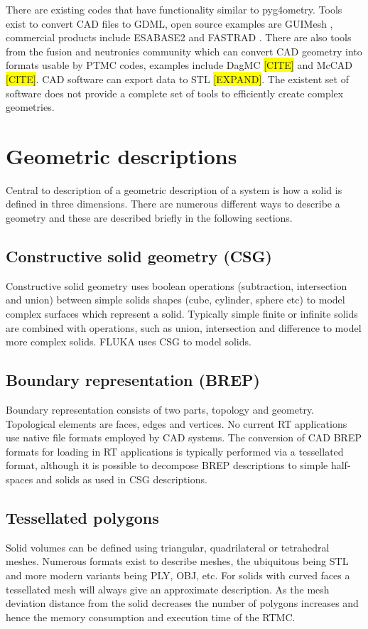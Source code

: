 \documentclass[final,5p,times,twocolumn]{elsarticle}
\begin{document}
There are existing codes that have functionality similar to pyg4ometry. Tools exist to convert CAD files to GDML, open source examples are GUIMesh \cite{GUIMesh_Pinto}, 
commercial products include ESABASE2 \cite{ESABASE2} and FASTRAD \cite{FASTRAD}. There are also tools from the fusion and neutronics community which 
can convert CAD geometry into formats usable by PTMC codes, examples include DagMC \colorbox{yellow}{[CITE]} and McCAD \colorbox{yellow}{[CITE]}.  
CAD software can export data to STL \colorbox{yellow}{[EXPAND]}. The existent set of software does not provide a complete set of tools to efficiently create complex geometries.   

\section{Geometric descriptions} \label{sec:geometric}
Central to description of a geometric description of a system is how a solid is defined in three dimensions. There are numerous different ways to describe a
geometry and these are described briefly in the following sections.  

\subsection{Constructive solid geometry (CSG)}
Constructive solid geometry uses boolean operations (subtraction, intersection and union) between simple solids shapes (cube, cylinder, sphere etc) to model complex 
surfaces which represent a solid. Typically simple finite or infinite solids are combined with operations, such as union, intersection and difference to model more 
complex solids. FLUKA uses CSG to model solids.

\subsection{Boundary representation (BREP)}
Boundary representation consists of two parts, topology and geometry. Topological elements are faces, edges and vertices. No current RT applications use native 
file formats employed by CAD systems. The conversion of CAD BREP formats for loading in RT applications is typically performed via a tessellated format, although it 
is possible to decompose BREP descriptions to simple half-spaces and solids as used in CSG descriptions. 

\subsection{Tessellated polygons}
Solid volumes can be defined using triangular, quadrilateral or tetrahedral meshes. Numerous formats exist to describe meshes, the ubiquitous being STL and more 
modern variants being PLY, OBJ, etc. For solids with curved faces a tessellated mesh will always give an approximate description. As the mesh deviation distance from the 
solid decreases the number of polygons increases and hence the memory consumption and execution time of the RTMC. 
\end{document}
